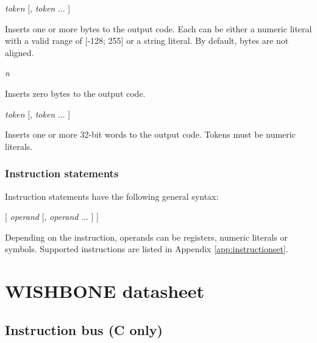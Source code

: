 \documentclass[a4paper,12pt,twoside,extrafontsizes]{memoir}
\begin{document}
\begin{codepar}
 \emph{token} [, \emph{token} ... ]
\end{codepar}

Inserts one or more bytes to the output code. Each  can be either a numeric literal with a valid range of [-128; 255] or a string literal. By default, bytes are not aligned.

\begin{codepar}
 \emph{n}
\end{codepar}

Inserts  zero bytes to the output code.

\begin{codepar}
 \emph{token} [, \emph{token} ... ]
\end{codepar}

Inserts one or more 32-bit words to the output code. Tokens must be numeric literals.

\subsection{Instruction statements}

Instruction statements have the following general syntax:

\begin{codepar}
     [ \emph{operand} [, \emph{operand} ... ] ]
\end{codepar}

Depending on the instruction, operands can be registers, numeric literals or symbols. Supported instructions are listed in Appendix \ref{app:instructionset}.

\chapter{WISHBONE datasheet}
\label{app:wishbonedatasheet}

\section[Instruction bus (LXP32C only)]{Instruction bus (\lxp{}C only)}
\end{document}
